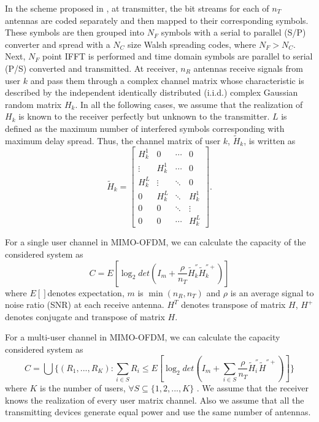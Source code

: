 In the scheme proposed in \cite{14}, at transmitter, the bit streams
for each of $n_{T}$ antennas are coded separately and then mapped to
their corresponding symbols. These symbols are then grouped into
$N_{F}$ symbols with a serial to parallel (S/P) converter and spread
with a $N_{C}$ size Walsh spreading codes, where $N_{F}>N_{C}$.
Next, $N_{F}$ point IFFT is performed and time domain symbols are
parallel to serial (P/S) converted and transmitted. At receiver,
$n_{R}$ antennas receive signals from user $k$ and pass them through
a complex channel matrix whose characteristic is described by the
independent identically distributed (i.i.d.) complex Gaussian random
matrix $H_{k}$. In all the following cases, we assume that the
realization of $H_{k}$ is known to the receiver perfectly but
unknown to the transmitter. $L$ is defined as the maximum number of
interfered symbols corresponding with maximum delay spread. Thus,
the channel matrix of user $k$, $\tilde{H}_{k}$, is written as
\[ \tilde{H}_{k}= \left[ \begin{array}{cccc}
H_{k}^{1} & 0 & \cdots & 0 \\
\vdots & H_{k}^{1} & \cdots & 0 \\
H_{k}^{L} & \vdots & \ddots & 0 \\
0 & H_{k}^{L} & \ddots & H_{k}^{1} \\
0 & 0 & \ddots & \vdots \\
0 & 0 & \cdots & H_{k}^{L} \end{array} \right].\]

For a single user channel in MIMO-OFDM, we can calculate the
capacity of the considered system as
\begin{equation}
C=E[\log_{2}det(I_{m}+\frac{\rho}{n_{T}}\tilde{H}_{k}^{''}\tilde{H}_{k}^{''+})]
\end{equation}
where $E[]$denotes expectation, $m$ is $\min(n_{R},n_{T})$ and
$\rho$ is an average signal to noise ratio (SNR) at each receive
antenna. $H^{T}$ denotes transpose of matrix $H$, $H^{+}$ denotes
conjugate and transpose of matrix $H$.

For a multi-user channel in MIMO-OFDM, we can calculate the capacity
considered system as
\begin{equation}
C=\bigcup\{(R_{1},...,R_{K}):\sum_{i\in S}{R_{i}}\leq
E[\log_{2}det(I_{m}+\sum_{i\in
S}\frac{\rho}{n_{T}}\tilde{H}_{i}^{''}\tilde{H}^{''+})]\}
\end{equation}
where $K$ is the number of users, $\forall S\subseteq\{1,2,...,K\}$
. We assume that the receiver knows the realization of every user
matrix channel. Also we assume that all the transmitting devices
generate equal power and use the same number of antennas.

